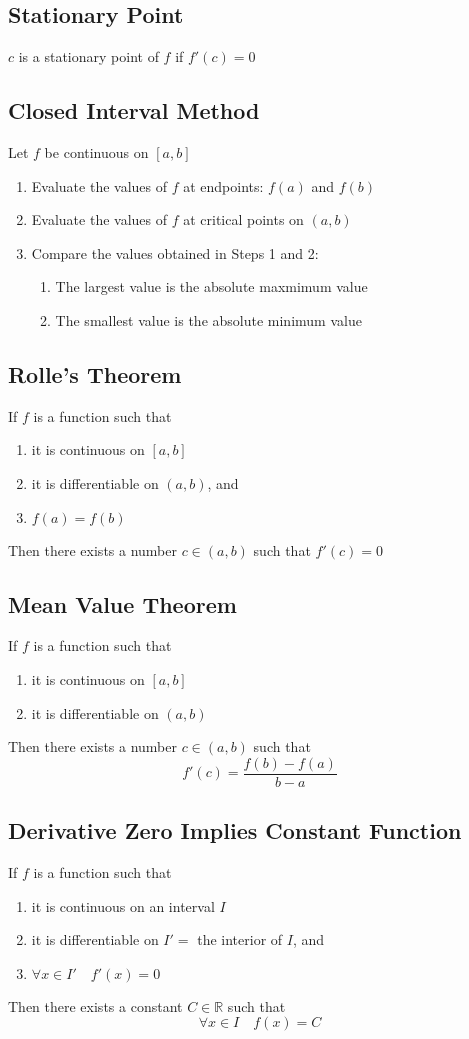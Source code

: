 \documentclass[../ma2002_notes.tex]{subfiles}
\begin{document}
\subsection{Stationary Point}
\(c\) is a stationary point of \(f\) if \(f'(c)=0\)

\subsection{Closed Interval Method}
Let \(f\) be continuous on \([a,b]\)
\begin{enumerate}
	\item Evaluate the values of \(f\) at endpoints: \(f(a)\) and \(f(b)\)
	\item Evaluate the values of \(f\) at critical points on \((a,b)\)
	\item Compare the values obtained in Steps 1 and 2:
	\begin{enumerate}
		\item The largest value is the absolute maxmimum value
		\item The smallest value is the absolute minimum value
	\end{enumerate}
\end{enumerate}

\subsection{Rolle's Theorem}
If \(f\) is a function such that
\begin{enumerate}
	\item it is continuous on \([a,b]\)
	\item it is differentiable on \((a,b)\), and
	\item \(f(a)=f(b)\)
\end{enumerate}
Then there exists a number \(c\in(a,b)\) such that \(f'(c)=0\)

\subsection{Mean Value Theorem}
If \(f\) is a function such that
\begin{enumerate}
	\item it is continuous on \([a,b]\)
	\item it is differentiable on \((a,b)\)
\end{enumerate}
Then there exists a number \(c\in(a,b)\) such that
\[f'(c)=\frac{f(b)-f(a)}{b-a}\]

\subsection{Derivative Zero Implies Constant Function}
If \(f\) is a function such that
\begin{enumerate}
	\item it is continuous on an interval \(I\)
	\item it is differentiable on \(I'=\) the interior of \(I\), and
	\item \(\forall x\in I'\quad f'(x)=0\)
\end{enumerate}
Then there exists a constant \(C\in\mathbb{R}\) such that
\[\forall x\in I\quad f(x)=C\]
\end{document}
